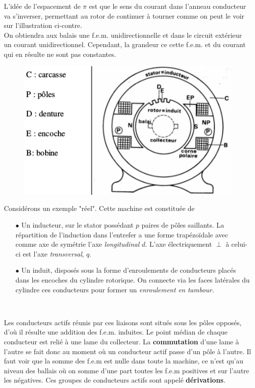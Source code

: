 	L'idée de l'espacement de $\pi$ est que le sens du courant dans 
	l'anneau conducteur va s'inverser, permettant au rotor de continuer 
	à tourner comme on peut le voir sur l'illustration ci-contre.\\
	On obtiendra aux balais une f.e.m. unidirectionnelle et dans le circuit 
	extérieur un courant unidirectionnel. Cependant, la grandeur ce cette 
	f.e.m. et du courant qui en résulte ne sont pas constantes.
	
	\newpage
	\begin{figure}
	\includegraphics[scale=0.4]{ch4/image2.png}
	\end{figure}
	Considérons un exemple "réel". Cette machine est constituée de 
	\begin{itemize}
	\item[$\bullet$] Un inducteur, sur le stator possédant $p$ paires de 
	pôles saillants. La répartition de l'induction dans l'entrefer a une 
	forme trapézoïdale avec comme axe de symétrie l'axe \textit{longitudinal} 
	$d$. L'axe électriquement $\perp$ à celui-ci est l'axe \textit{transversal},
	$q$.
	\item[$\bullet$] 	Un induit, disposés sous la forme d'enroulements de 
	conducteurs placés dans les encoches du cylindre rotorique. On connecte 
	via les faces latérales du cylindre ces conducteurs pour former un 
	\textit{enroulement en tambour.} 
	\end{itemize}\ 
	
	Les conducteurs actifs réunis par ces liaisons sont situés sous les 
	pôles opposés, d’où il résulte une addition des f.e.m. induites.
	Le point médian de chaque conducteur est relié à une lame du collecteur. 
	La \textbf{commutation} d’une lame à l’autre se fait donc au moment 
	où un conducteur actif passe d’un pôle à l’autre. Il faut voir que la somme des 
	f.e.m est nulle dans toute la machine, ce n'est qu'au niveau des ballais où on 
	somme d'une part toutes les f.e.m positives et sur l'autre les négatives. Ces 
	groupes de conducteurs actifs sont appelé \textbf{dérivations}.
	
